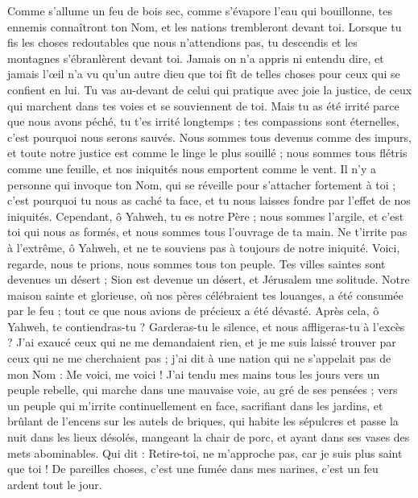 \begin{multicols}{2}
\VerseOne{}Comme s'allume un feu de bois sec, comme s'évapore l'eau qui bouillonne, tes ennemis connaîtront ton Nom, et les nations trembleront devant toi.
Lorsque tu fis les choses redoutables que nous n'attendions pas, tu descendis et les montagnes s'ébranlèrent devant toi.
Jamais on n'a appris ni entendu dire, et jamais l'œil n'a vu qu'un autre dieu que toi fît de telles choses pour ceux qui se confient en lui.
Tu vas au-devant de celui qui pratique avec joie la justice, de ceux qui marchent dans tes voies et se souviennent de toi. Mais tu as été irrité parce que nous avons péché, tu t'es irrité longtemps ; tes compassions sont éternelles, c'est pourquoi nous serons sauvés.
Nous sommes tous devenus comme des impurs, et toute notre justice est comme le linge le plus souillé ; nous sommes tous flétris comme une feuille, et nos iniquités nous emportent comme le vent.
Il n'y a personne qui invoque ton Nom, qui se réveille pour s'attacher fortement à toi ; c'est pourquoi tu nous as caché ta face, et tu nous laisses fondre par l'effet de nos iniquités.
Cependant, ô Yahweh, tu es notre Père ; nous sommes l'argile, et c'est toi qui nous as formés, et nous sommes tous l'ouvrage de ta main.
Ne t'irrite pas à l'extrême, ô Yahweh, et ne te souviens pas à toujours de notre iniquité. Voici, regarde, nous te prions, nous sommes tous ton peuple.
Tes villes saintes sont devenues un désert ; Sion est devenue un désert, et Jérusalem une solitude.
Notre maison sainte et glorieuse, où nos pères célébraient tes louanges, a été consumée par le feu ; tout ce que nous avions de précieux a été dévasté.
Après cela, ô Yahweh, te contiendras-tu ? Garderas-tu le silence, et nous affligeras-tu à l'excès ?
\VerseOne{}J'ai exaucé ceux qui ne me demandaient rien, et je me suis laissé trouver par ceux qui ne me cherchaient pas ; j'ai dit à une nation qui ne s'appelait pas de mon Nom : Me voici, me voici !
J'ai tendu mes mains tous les jours vers un peuple rebelle, qui marche dans une mauvaise voie, au gré de ses pensées ;
vers un peuple qui m'irrite continuellement en face, sacrifiant dans les jardins, et brûlant de l'encens sur les autels de briques,
qui habite les sépulcres et passe la nuit dans les lieux désolés, mangeant la chair de porc, et ayant dans ses vases des mets abominables.
Qui dit : Retire-toi, ne m'approche pas, car je suis plus saint que toi ! De pareilles choses, c'est une fumée dans mes narines, c'est un feu ardent tout le jour.

\end{multicols}
